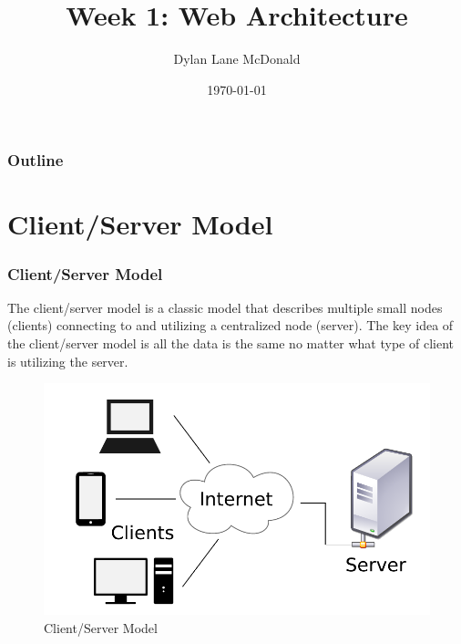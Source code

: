 \documentclass[aspectratio=169]{beamer}
\title{Week 1: Web Architecture}
\author{Dylan Lane McDonald}
\institute{CNM STEMulus Center\\Web Development with PHP}
\date{\today}
\begin{document}
\begin{frame}
\titlepage
\end{frame}

\begin{frame}
\frametitle{Outline}
\tableofcontents
\end{frame}

\section{Client/Server Model}
\begin{frame}
\frametitle{Client/Server Model}
The client/server model is a classic model that describes multiple small nodes (clients) connecting to and utilizing a centralized node (server). The key idea of the client/server model is all the data is the same no matter what type of client is utilizing the server.

\begin{figure}
\includegraphics[scale=0.4]{../artifacts/client-server.pdf}
\caption{Client/Server Model}
\label{fig:client-server}
\end{figure}
\end{frame}
\end{document}
